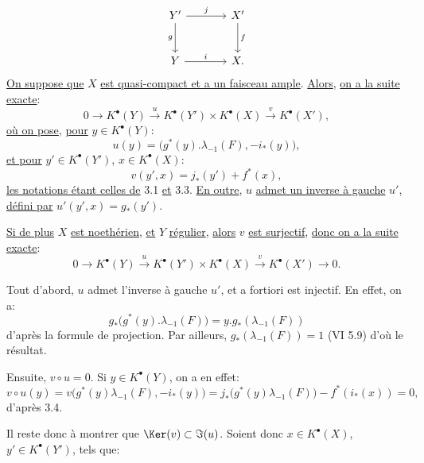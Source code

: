 
\[
\begin{tikzcd}[column sep=large,row sep=large]
Y' \arrow[r,"j"] \arrow[d,"g"'] & X' \arrow[d,"f"]\\
Y \arrow[r,"i"] & X.
\end{tikzcd}
\]
\uline{On
suppose que} \(X\) \uline{est quasi-compact et a un faisceau ample}. \uline{Alors}, \uline{on a la suite exacte}:
\[
0\longrightarrow K^{\bullet}(Y)\xrightarrow{u}K^{\bullet}(Y')\times K^{\bullet}(X)
\xrightarrow{v}K^{\bullet}(X'),
\]
\uline{où on pose}, \uline{pour} \(y\in K^{\bullet}(Y)\):
\[
u(y)=\bigl(g^*(y).\lambda_{-1}(F),-i_*(y)\bigr),
\]
\uline{et pour} \(y'\in K^{\bullet}(Y')\), \(x\in K^{\bullet}(X)\):
\[
v(y',x)=j_*(y')+f^*(x),
\]
\uline{les notations étant celles de} 3.1 \uline{et} 3.3. \uline{En outre}, \(u\) \uline{admet un inverse à gauche} \(u'\), \uline{défini par} \(u'(y',x)=g_*(y')\).

\uline{Si de plus} \(X\) \uline{est noethérien}, \uline{et} \(Y\) \uline{régulier}, \uline{alors} \(v\) \uline{est surjectif}, \uline{donc on a la suite exacte}:
\[
0\longrightarrow K^{\bullet}(Y)\xrightarrow{u}K^{\bullet}(Y')\times K^{\bullet}(X)
\xrightarrow{v}K^{\bullet}(X')\longrightarrow0.
\]

Tout d'abord, \(u\) admet l'inverse à gauche \(u'\), et a fortiori est injectif. En effet, on a:
\[
g_*\bigl(g^*(y).\lambda_{-1}(F)\bigr)
=y.g_*(\lambda_{-1}(F))
\]
d'après la formule de projection. Par ailleurs, \(g_*(\lambda_{-1}(F))=1\) (VI 5.9) d'où le résultat.

Ensuite, \(v\circ u=0\). Si \(y\in K^{\bullet}(Y)\), on a en effet:
\[
v\circ u(y)
=v\bigl(g^*(y)\lambda_{-1}(F),-i_*(y)\bigr)
=j_*\bigl(g^*(y)\lambda_{-1}(F)\bigr)-f^*(i_*(x))=0,
\]
d'après 3.4.

Il reste donc à montrer que \(\Ker(v)\subset \Im(u)\). Soient donc \(x\in K^{\bullet}(X)\), \(y'\in K^{\bullet}(Y')\), tels que:
